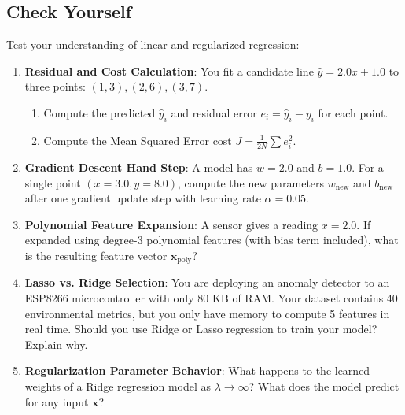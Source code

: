\subsection{Check Yourself}

Test your understanding of linear and regularized regression:

\begin{enumerate}
    \item \textbf{Residual and Cost Calculation}: You fit a candidate line $\hat{y} = 2.0x + 1.0$ to three points: $(1, 3), (2, 6), (3, 7)$.
    \begin{enumerate}
        \item Compute the predicted $\hat{y}_i$ and residual error $e_i = \hat{y}_i - y_i$ for each point.
        \item Compute the Mean Squared Error cost $J = \frac{1}{2N} \sum e_i^2$.
    \end{enumerate}

    \item \textbf{Gradient Descent Hand Step}: A model has $w = 2.0$ and $b = 1.0$. For a single point $(x = 3.0, y = 8.0)$, compute the new parameters $w_{\text{new}}$ and $b_{\text{new}}$ after one gradient update step with learning rate $\alpha = 0.05$.

    \item \textbf{Polynomial Feature Expansion}: A sensor gives a reading $x = 2.0$. If expanded using degree-3 polynomial features (with bias term included), what is the resulting feature vector $\mathbf{x}_{\text{poly}}$?

    \item \textbf{Lasso vs. Ridge Selection}: You are deploying an anomaly detector to an ESP8266 microcontroller with only $80\text{ KB}$ of RAM. Your dataset contains 40 environmental metrics, but you only have memory to compute 5 features in real time. Should you use Ridge or Lasso regression to train your model? Explain why.

    \item \textbf{Regularization Parameter Behavior}: What happens to the learned weights of a Ridge regression model as $\lambda \to \infty$? What does the model predict for any input $\mathbf{x}$?
\end{enumerate}

